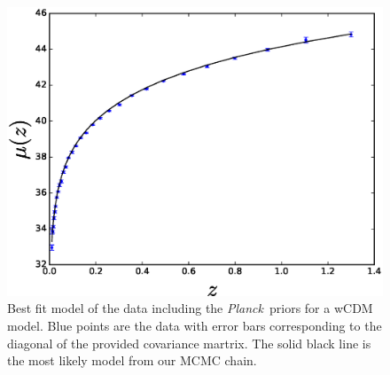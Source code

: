 \documentclass[12pt,a4paper]{article}
\newcommand\Planck{{\it Planck}\ }
\begin{document}
\begin{figure}
  \centering
  \includegraphics[width=0.5\linewidth]{figures/betoule_wcdm_withprior_bestfit.eps}
  \caption{Best fit model of the \citet{betoule2014} data including the
    \Planck priors for a wCDM model. Blue points are the data with
    error bars corresponding to the diagonal of the provided covariance martrix.
    The solid black line is the most likely model from our MCMC chain.}
  \label{fig:betoule_wcdm_noprior_bestfit}
\end{figure}
\end{document}
